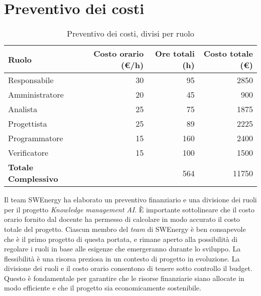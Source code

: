 \section{Preventivo dei costi}

\begin{table}[H]
	\renewcommand{\arraystretch}{1.5}
	\centering
	\begin{tabular}{l|r|r|r}
		\textbf{Ruolo} & \textbf{Costo orario (€/h)} & \textbf{Ore totali (h)} & 
		\textbf{Costo totale (€)} \\
		\hline
		Responsabile				&	 30 &  95 &	 2850			\\
		Amministratore				&	 20 &  45 &   900  			\\
		Analista					&	 25 &  75 &  1875			\\
		Progettista					&	 25 &  89 &  2225			\\
		Programmatore				&	 15 & 160 &  2400			\\
		Verificatore				&	 15 & 100 &  1500			\\
		\hline
		\textbf{Totale Complessivo} &		& 564 &	11750			\\
	\end{tabular}
	\caption{Preventivo dei costi, divisi per ruolo}

\end{table}

Il team SWEnergy ha elaborato un preventivo finanziario e una divisione dei
ruoli per il progetto \textit{Knowledge management AI}. È importante 
sottolineare che il costo orario fornito dal docente ha permesso di calcolare 
in modo accurato il costo totale del progetto. 
Ciascun membro del \textit{team} di SWEnergy è ben consapevole che è il primo
progetto di questa portata, e 
rimane aperto alla possibilità di regolare i ruoli in base alle esigenze che 
emergeranno durante lo sviluppo. La flessibilità è una risorsa preziosa in un 
contesto di progetto in evoluzione.
La divisione dei ruoli e il costo orario consentono di tenere sotto controllo il
budget. Questo è fondamentale per garantire che le risorse finanziarie siano 
allocate in modo efficiente e che il progetto sia economicamente sostenibile.
